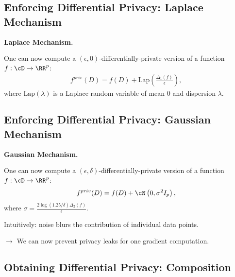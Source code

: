 \documentclass[notheorems]{beamer}
\begin{document}
\subsection{Enforcing Differential Privacy: Laplace Mechanism}
\label{sub:enforcing_differential_privacy_laplace_mechanism}


\begin{frame}
  \textbf{Laplace Mechanism.}

  One can now compute a $(\epsilon, 0)$-differentially-private version of a function $f : \cD \rightarrow \RR^p$:
  \begin{align}
    f^{priv}(D) = f(D) + \text{Lap}\left( \frac{\Delta_1(f)}{\epsilon} \right),
  \end{align}
  where $\text{Lap}\left( \lambda \right)$ is a Laplace random variable of mean $0$ and dispersion $ \lambda$.
\end{frame}



\subsection{Enforcing Differential Privacy: Gaussian Mechanism}
\label{sub:enforcing_differential_privacy_gaussian_mechanism}

\begin{frame}
  \textbf{Gaussian Mechanism.}

  One can now compute a $(\epsilon, \delta)$-differentially-private version of a function $f : \cD \rightarrow \RR^p$:
  \begin{align}
    f^{priv}(D) = f(D) + \cN\left( 0, \sigma^2 I_p \right),
  \end{align}
  where $\displaystyle \sigma = \frac{2 \log(1.25/\delta) \Delta_2(f)}{\epsilon}$.
\end{frame}


\begin{frame}

  Intuitively: noise blurs the contribution of individual data points.

  \quad $\rightarrow$ We can now prevent privacy leaks for one gradient computation.
\end{frame}


\subsection{Obtaining Differential Privacy: Composition}
\label{sub:Obtaining_differential_privacy_composition}
\end{document}
